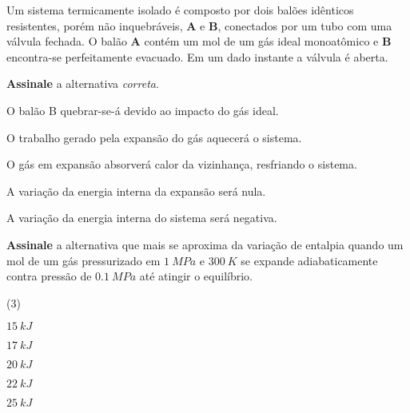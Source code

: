 \documentclass[braun, twocolumn]{braun}
\begin{document}
\begin{problem}
[2A10]Um sistema termicamente isolado é composto por dois balões idênticos
resistentes, porém não inquebráveis, \textbf{A} e \textbf{B}, conectados
por um tubo com uma válvula fechada. O balão \textbf{A} contém um mol de
um gás ideal monoatômico e \textbf{B} encontra-se perfeitamente
evacuado. Em um dado instante a válvula é aberta.

\textbf{Assinale} a alternativa \emph{correta}.


\begin{choices}

\item O balão B quebrar-se-á devido ao impacto do gás ideal.

\item O trabalho gerado pela expansão do gás aquecerá o sistema.

\item O gás em expansão absorverá calor da vizinhança, resfriando o sistema.

\item A variação da energia interna da expansão será nula.

\item A variação da energia interna do sistema será negativa.

\end{choices}

\end{problem}



\begin{problem}
[2A11]\textbf{Assinale} a alternativa que mais se aproxima da variação de
entalpia quando um mol de um gás pressurizado em \(\qty{1}{MPa}\) e
\(\qty{300}{K}\) se expande adiabaticamente contra pressão de
\(\qty{0,1}{MPa}\) até atingir o equilíbrio.


\begin{choices}
(3)
\item \(\qty{15}{kJ}\)

\item \(\qty{17}{kJ}\)

\item \(\qty{20}{kJ}\)

\item \(\qty{22}{kJ}\)

\item \(\qty{25}{kJ}\)

\end{choices}

\end{problem}
\end{document}

